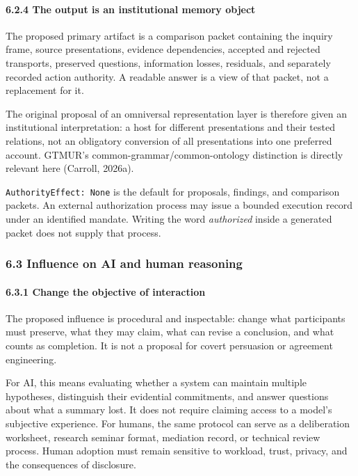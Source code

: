 \documentclass[
  10pt,
]{article}
\begin{document}
\paragraph{6.2.4 The output is an institutional memory object}\label{the-output-is-an-institutional-memory-object}

The proposed primary artifact is a comparison packet containing the inquiry frame, source presentations, evidence dependencies, accepted and rejected transports, preserved questions, information losses, residuals, and separately recorded action authority. A readable answer is a view of that packet, not a replacement for it.

The original proposal of an omniversal representation layer is therefore given an institutional interpretation: a host for different presentations and their tested relations, not an obligatory conversion of all presentations into one preferred account. GTMUR's common-grammar/common-ontology distinction is directly relevant here (Carroll, 2026a).

\texttt{AuthorityEffect:\ None} is the default for proposals, findings, and comparison packets. An external authorization process may issue a bounded execution record under an identified mandate. Writing the word \emph{authorized} inside a generated packet does not supply that process.

\subsubsection{6.3 Influence on AI and human reasoning}\label{influence-on-ai-and-human-reasoning}

\paragraph{6.3.1 Change the objective of interaction}\label{change-the-objective-of-interaction}

The proposed influence is procedural and inspectable: change what participants must preserve, what they may claim, what can revise a conclusion, and what counts as completion. It is not a proposal for covert persuasion or agreement engineering.

For AI, this means evaluating whether a system can maintain multiple hypotheses, distinguish their evidential commitments, and answer questions about what a summary lost. It does not require claiming access to a model's subjective experience. For humans, the same protocol can serve as a deliberation worksheet, research seminar format, mediation record, or technical review process. Human adoption must remain sensitive to workload, trust, privacy, and the consequences of disclosure.
\end{document}
